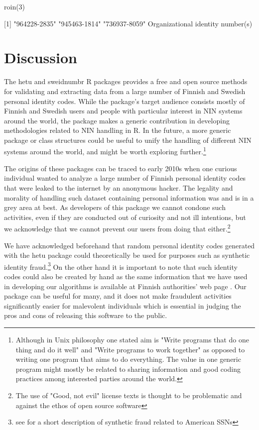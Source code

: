  \begin{example}
   roin(3)

   [1] "964228-2835" "945463-1814" "736937-8059"
   Organizational identity number(s)
 \end{example}


\section{Discussion}

The hetu and sweidnumbr R packages provides a free and open source methods for validating and extracting data from a large number of Finnish and Swedish personal identity codes. While the package's target audience consists mostly of Finnish and Swedish users and people with particular interest in NIN systems around the world, the package makes a generic contribution in developing methodologies related to NIN handling in R. In the future, a more generic package or class structures could be useful to unify the handling of different NIN systems around the world, and might be worth exploring further.\footnote{Although in Unix philosophy one stated aim is "Write programs that do one thing and do it well" and "Write programs to work together" as opposed to writing one program that aims to do everything. The value in one generic program might mostly be related to sharing information and good coding practices among interested parties around the world.}

The origins of these packages can be traced to early 2010s when one curious individual wanted to analyze a large number of Finnish personal identity codes that were leaked to the internet by an anonymous hacker. The legality and morality of handling such dataset containing personal information was and is in a grey area at best. As developers of this package we cannot condone such activities, even if they are conducted out of curiosity and not ill intentions, but we acknowledge that we cannot prevent our users from doing that either.\footnote{The use of "Good, not evil" license texts is thought to be problematic and against the ethos of open source software} 

We have acknowledged beforehand that random personal identity codes generated with the hetu package could theoretically be used for purposes such as synthetic identity fraud.\footnote{see \citet[32]{brensinger2021} for a short description of synthetic fraud related to American SSNs} On the other hand it is important to note that such identity codes could also be created by hand as the same information that we have used in developing our algorithms is available at Finnish authorities' web page \citep{hetudvv}. Our package can be useful for many, and it does not make fraudulent activities significantly easier for malevolent individuals which is essential in judging the pros and cons of releasing this software to the public.

